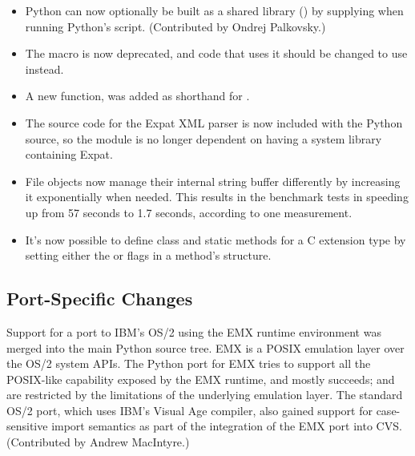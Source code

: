 \documentclass{howto}
\begin{document}
\begin{itemize}

\item Python can now optionally be built as a shared library
() by supplying 
when running Python's  script.  (Contributed by Ondrej
Palkovsky.)

\item The  macro is now deprecated, and code
that
uses it should be changed to use 
instead.

\item A new function,  was added
as shorthand for 
.

\item The source code for the Expat XML parser is now included with
the Python source, so the  module is no longer
dependent on having a system library containing Expat.

\item File objects now manage their internal string buffer
differently by increasing it exponentially when needed.  
This results in the benchmark tests in  
speeding up from 57 seconds to 1.7 seconds, according to one
measurement.

\item It's now possible to define class and static methods for a C
extension type by setting either the  or
 flags in a method's 
structure.

\end{itemize}

\subsection{Port-Specific Changes}

Support for a port to IBM's OS/2 using the EMX runtime environment was
merged into the main Python source tree.  EMX is a POSIX emulation
layer over the OS/2 system APIs.  The Python port for EMX tries to
support all the POSIX-like capability exposed by the EMX runtime, and
mostly succeeds;  and  are
restricted by the limitations of the underlying emulation layer.  The
standard OS/2 port, which uses IBM's Visual Age compiler, also gained
support for case-sensitive import semantics as part of the integration
of the EMX port into CVS.  (Contributed by Andrew MacIntyre.)
\end{document}
